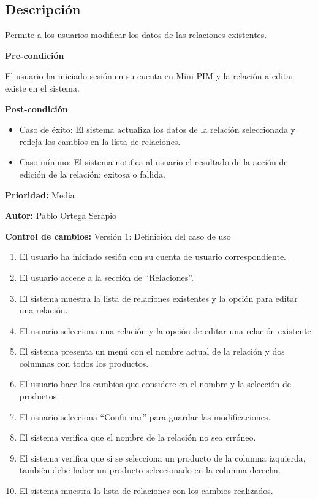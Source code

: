 
\subsection*{Descripción}
Permite a los usuarios modificar los datos de las relaciones existentes.\par
\vspace{0.15cm}

\textbf{Pre-condición}\par
El usuario ha iniciado sesión en su cuenta en Mini PIM y la relación a editar existe en el sistema.\par
\vspace{0.15cm}

\textbf{Post-condición}
\begin{itemize}
    \item Caso de éxito: El sistema actualiza los datos de la relación seleccionada y refleja los cambios en la lista de relaciones.
    \item Caso mínimo: El sistema notifica al usuario el resultado de la acción de edición de la relación: exitosa o fallida.
\end{itemize}

\textbf{Prioridad: }
Media
\vspace{0.15cm}

\textbf{Autor: }
Pablo Ortega Serapio\par
\vspace{0.15cm}

\textbf{Control de cambios: } Versión 1: Definición del caso de uso

\begin{enumerate}
    \item El usuario ha iniciado sesión con su cuenta de usuario correspondiente.
    \item El usuario accede a la sección de \enquote{Relaciones}.
    \item El sistema muestra la lista de relaciones existentes y la opción para editar una relación.
    \item El usuario selecciona una relación y la opción de editar una relación existente.
    \item El sistema presenta un menú con el nombre actual de la relación y dos columnas con todos los productos.
    \item El usuario hace los cambios que considere en el nombre y la selección de productos.
    \item El usuario selecciona \enquote{Confirmar} para guardar las modificaciones.
    \item El sistema verifica que el nombre de la relación no sea erróneo.
    \item El sistema verifica que si se selecciona un producto de la columna izquierda, también debe haber un producto seleccionado en la columna derecha.
    \item El sistema muestra la lista de relaciones con los cambios realizados.
\end{enumerate}

